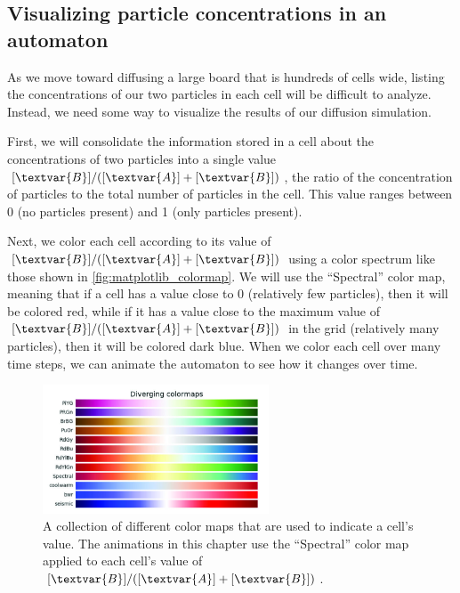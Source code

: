 \begin{qbox}[%
Update the cells in \autoref{fig:two_particle_concentration_diffusion} after another generation of diffusion, using the diffusion rates $d_A = 0.2$ and $d_B = 0.1$.
]\end{qbox}

\FloatBarrier
{}
\subsection{Visualizing particle concentrations in an automaton}

As we move toward diffusing a large board that is hundreds of cells wide, listing the concentrations of our two particles in each cell will be difficult to analyze. Instead, we need some way to visualize the results of our diffusion simulation.

First, we will consolidate the information stored in a cell about the concentrations of two particles into a single value $[\textvar{B}]/([\textvar{A}] + [\textvar{B}])$, the ratio of the concentration of  particles to the total number of particles in the cell. This value ranges between 0 (no  particles present) and 1 (only  particles present).\\

\begin{qbox}\end{qbox}

Next, we color each cell according to its value of $[\textvar{B}]/([\textvar{A}] + [\textvar{B}])$ using a color spectrum like those shown in \autoref{fig:matplotlib_colormap}. We will use the ``Spectral'' color map, meaning that if a cell has a value close to 0 (relatively few  particles), then it will be colored red, while if it has a value close to the maximum value of $[\textvar{B}]/([\textvar{A}] + [\textvar{B}])$ in the grid (relatively many  particles), then it will be colored dark blue. When we color each cell over many time steps, we can animate the automaton to see how it changes over time.\\

\begin{figure}[h]
\centering
\mySfFamily
\includegraphics[width = 0.6\textwidth]{../images_CMYK/matplotlib_colormap}
\caption{A collection of different color maps that are used to indicate a cell's value. The animations in this chapter use the ``Spectral'' color map applied to each cell's value of $[\textvar{B}]/([\textvar{A}] + [\textvar{B}])$.}
\label{fig:matplotlib_colormap}
\end{figure}

